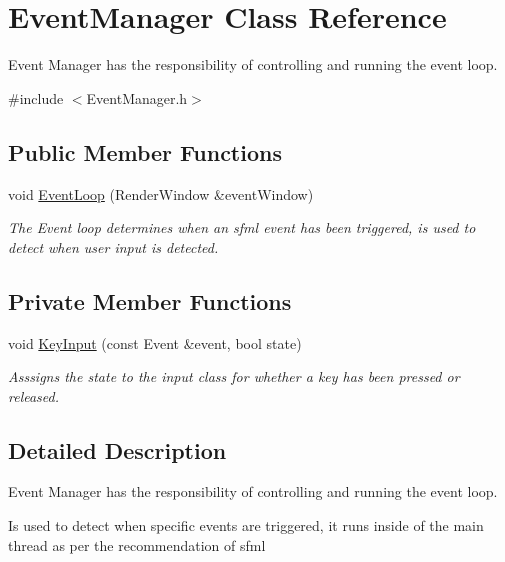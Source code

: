 \hypertarget{class_event_manager}{}\section{Event\+Manager Class Reference}
\label{class_event_manager}


Event Manager has the responsibility of controlling and running the event loop.  




{\ttfamily \#include $<$Event\+Manager.\+h$>$}

\subsection*{Public Member Functions}
\begin{DoxyCompactItemize}
\item 
void \hyperlink{class_event_manager_a3e90c3658f1fc88b45ba1b8fda4f2c10}{Event\+Loop} (Render\+Window \&event\+Window)
\begin{DoxyCompactList}\small\item\em The Event loop determines when an sfml event has been triggered, is used to detect when user input is detected. \end{DoxyCompactList}\end{DoxyCompactItemize}
\subsection*{Private Member Functions}
\begin{DoxyCompactItemize}
\item 
void \hyperlink{class_event_manager_a279b1d4e14cd98c1b3789a5276be2b3a}{Key\+Input} (const Event \&event, bool state)
\begin{DoxyCompactList}\small\item\em Asssigns the state to the input class for whether a key has been pressed or released. \end{DoxyCompactList}\end{DoxyCompactItemize}


\subsection{Detailed Description}
Event Manager has the responsibility of controlling and running the event loop. 

Is used to detect when specific events are triggered, it runs inside of the main thread as per the recommendation of sfml 

